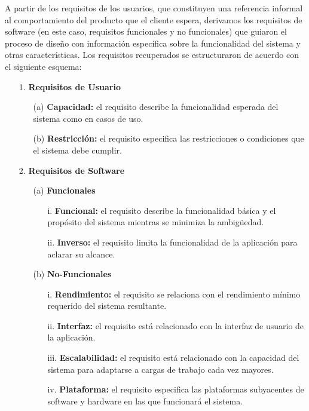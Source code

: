 A partir de los requisitos de los usuarios, que constituyen una referencia informal al comportamiento del producto que el cliente espera, derivamos los requisitos de software (en este caso, requisitos funcionales y no funcionales) que guiaron el proceso de diseño con información específica sobre la funcionalidad del sistema y otras características. Los requisitos recuperados se estructuraron de acuerdo con el siguiente esquema:


\begin{itemize}
\item[1.] \textbf{Requisitos de Usuario} 
	\begin{itemize}
		\item[(a)] \textbf{Capacidad:} el requisito describe la funcionalidad esperada del sistema como en casos de uso.
		\item[(b)] \textbf{Restricción:} el requisito especifica las restricciones o condiciones que el sistema debe cumplir.
	\end{itemize}	
\end{itemize}

\begin{itemize}
\item[2.] \textbf{Requisitos de Software}
	\begin{itemize}
	\item[(a)] 	\textbf{Funcionales}
		\begin{itemize}
		\item[i.] 	\textbf{Funcional:} el requisito describe la funcionalidad básica y el propósito del sistema mientras se minimiza la ambigüedad.
		\item[ii.] 	\textbf{Inverso:} el requisito limita la funcionalidad de la aplicación para aclarar su alcance.
		\end{itemize}

	\item[(b)] 	\textbf{No-Funcionales}
		\begin{itemize}
		\item[i.] 	\textbf{Rendimiento:} el requisito se relaciona con el rendimiento mínimo requerido del sistema resultante.
		\item[ii.] 	\textbf{Interfaz:} el requisito está relacionado con la interfaz de usuario de la aplicación.
		\item[iii.] 	\textbf{Escalabilidad:} el requisito está relacionado con la capacidad del sistema para adaptarse a cargas de trabajo cada vez mayores.
		\item[iv.] 	\textbf{Plataforma:} el requisito especifica las plataformas subyacentes de software y hardware en las que funcionará el sistema.
		\end{itemize}			
	\end{itemize}
\end{itemize}

